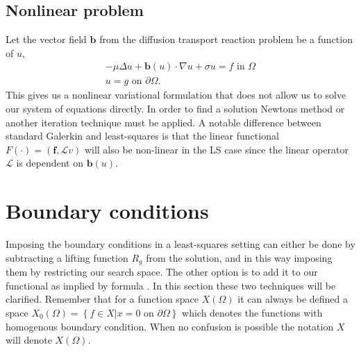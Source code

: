 \subsection{Nonlinear problem}
Let the vector field $\mathbf{b}$ from the diffusion transport reaction problem be a function of $u$,
\begin{align}
	-\mu \Delta u + \mathbf{b}(u) \cdot \nabla u +\sigma u = f \text{ in } \Omega \\
	u = g \text{ on } \partial \Omega.
	\label{eq:DiffTransNonLin}
\end{align}
This gives us a nonlinear variational formulation that does not allow us to solve our system of equations directly. In order to find a solution Newtons method or another iteration technique must be applied. A notable difference between standard Galerkin and least-squares is that the linear functional $F(\cdot) = (\mathbf{f},\mathcal{L} v)$ will also be non-linear in the LS case since the linear operator $\mathcal{L}$ is dependent on $\mathbf{b}(u)$.
\section{Boundary conditions} \label{BC}
Imposing the boundary conditions in a least-squares setting can either be done by subtracting a lifting function $R_g$ from the solution, and in this way imposing them by restricting our search space. The other option is to add it to our functional as implied by formula . In this section these two techniques will be clarified. Remember that for a function space $X(\Omega)$ it can always be defined a space $X_0(\Omega) = \left\{ f\in X | x = 0 \text{ on } \partial \Omega \right\}$ which denotes the functions with homogenous boundary condition. When no confusion is possible the notation $X$ will denote $X(\Omega)$. 
